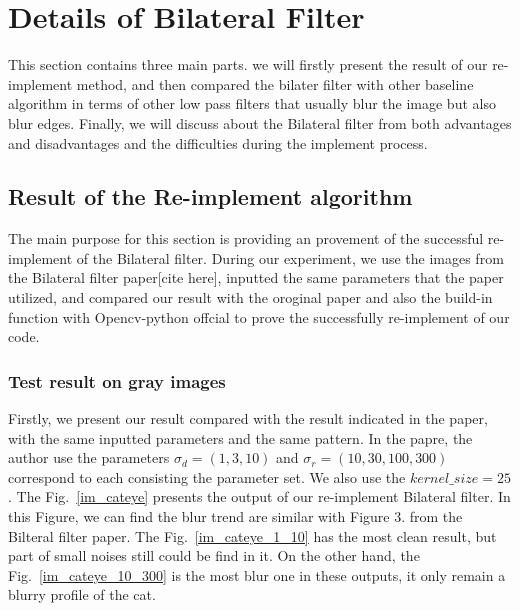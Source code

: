 \documentclass[12pt]{article}
\begin{document}
\section{Details of Bilateral Filter}
\label{section Bilateral_filter}
This section contains three main parts. we will firstly present the result of our re-implement method, and then compared the bilater filter with other baseline algorithm in terms of other low pass filters that usually blur the image but also blur edges. 
Finally, we will discuss about the Bilateral filter from both advantages and disadvantages and the difficulties during the implement process.


\subsection{Result of the Re-implement algorithm}
\label{section reimplement}
The main purpose for this section is providing an provement of the successful re-implement of the Bilateral filter.
During our experiment, we use the images from the Bilateral filter paper[cite here], inputted the same parameters that the paper utilized, and compared our result with the oroginal paper and also the build-in function with Opencv-python offcial to prove the successfully re-implement of our code.

\subsubsection{Test result on gray images}
\label{subsection test gray}
Firstly, we present our result compared with the result indicated in the paper, with the same inputted parameters and the same pattern.
In the papre, the author use the parameters $\sigma_d = (1, 3, 10)$ and $\sigma_r = (10, 30, 100, 300)$ correspond to each consisting the parameter set.  
We also use the $kernel\_size = 25$.
The Fig.~\ref{im_cateye} presents the output of our re-implement Bilateral filter.
In this Figure, we can find the blur trend are similar with Figure 3. from the Bilteral filter paper.
The Fig.~\ref{im_cateye_1_10} has the most clean result, but part of small noises still could be find in it. 
On the other hand, the Fig.~\ref{im_cateye_10_300} is the most blur one in these outputs, it only remain a blurry profile of the cat. 
\end{document}
